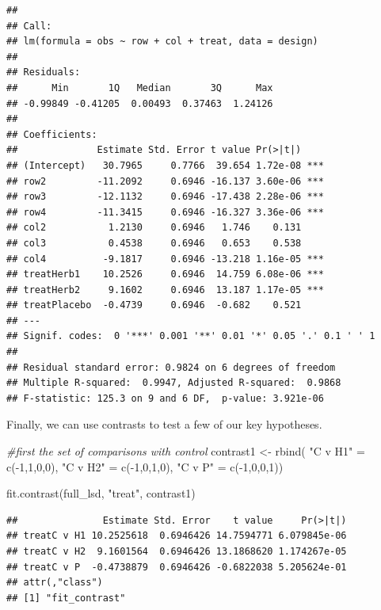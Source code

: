 \documentclass[
]{book}
\newenvironment{Shaded}{\begin{snugshade}}{\end{snugshade}}
\newcommand{\CommentTok}[1]{\textcolor[rgb]{0.56,0.35,0.01}{\textit{#1}}}
\newcommand{\DecValTok}[1]{\textcolor[rgb]{0.00,0.00,0.81}{#1}}
\newcommand{\FunctionTok}[1]{\textcolor[rgb]{0.00,0.00,0.00}{#1}}
\newcommand{\NormalTok}[1]{#1}
\newcommand{\OtherTok}[1]{\textcolor[rgb]{0.56,0.35,0.01}{#1}}
\newcommand{\SpecialCharTok}[1]{\textcolor[rgb]{0.00,0.00,0.00}{#1}}
\newcommand{\StringTok}[1]{\textcolor[rgb]{0.31,0.60,0.02}{#1}}
\begin{document}
\begin{verbatim}
## 
## Call:
## lm(formula = obs ~ row + col + treat, data = design)
## 
## Residuals:
##      Min       1Q   Median       3Q      Max 
## -0.99849 -0.41205  0.00493  0.37463  1.24126 
## 
## Coefficients:
##              Estimate Std. Error t value Pr(>|t|)    
## (Intercept)   30.7965     0.7766  39.654 1.72e-08 ***
## row2         -11.2092     0.6946 -16.137 3.60e-06 ***
## row3         -12.1132     0.6946 -17.438 2.28e-06 ***
## row4         -11.3415     0.6946 -16.327 3.36e-06 ***
## col2           1.2130     0.6946   1.746    0.131    
## col3           0.4538     0.6946   0.653    0.538    
## col4          -9.1817     0.6946 -13.218 1.16e-05 ***
## treatHerb1    10.2526     0.6946  14.759 6.08e-06 ***
## treatHerb2     9.1602     0.6946  13.187 1.17e-05 ***
## treatPlacebo  -0.4739     0.6946  -0.682    0.521    
## ---
## Signif. codes:  0 '***' 0.001 '**' 0.01 '*' 0.05 '.' 0.1 ' ' 1
## 
## Residual standard error: 0.9824 on 6 degrees of freedom
## Multiple R-squared:  0.9947, Adjusted R-squared:  0.9868 
## F-statistic: 125.3 on 9 and 6 DF,  p-value: 3.921e-06
\end{verbatim}

Finally, we can use contrasts to test a few of our key hypotheses.

\begin{Shaded}
\begin{Highlighting}[]
\CommentTok{\#first the set of comparisons with control}
\NormalTok{contrast1 }\OtherTok{\textless{}{-}} \FunctionTok{rbind}\NormalTok{(}
  \StringTok{"C v H1"} \OtherTok{=} \FunctionTok{c}\NormalTok{(}\SpecialCharTok{{-}}\DecValTok{1}\NormalTok{,}\DecValTok{1}\NormalTok{,}\DecValTok{0}\NormalTok{,}\DecValTok{0}\NormalTok{),}
  \StringTok{"C v H2"} \OtherTok{=} \FunctionTok{c}\NormalTok{(}\SpecialCharTok{{-}}\DecValTok{1}\NormalTok{,}\DecValTok{0}\NormalTok{,}\DecValTok{1}\NormalTok{,}\DecValTok{0}\NormalTok{),}
  \StringTok{"C v P"} \OtherTok{=} \FunctionTok{c}\NormalTok{(}\SpecialCharTok{{-}}\DecValTok{1}\NormalTok{,}\DecValTok{0}\NormalTok{,}\DecValTok{0}\NormalTok{,}\DecValTok{1}\NormalTok{))}

\FunctionTok{fit.contrast}\NormalTok{(full\_lsd, }\StringTok{"treat"}\NormalTok{, contrast1)}
\end{Highlighting}
\end{Shaded}

\begin{verbatim}
##               Estimate Std. Error    t value     Pr(>|t|)
## treatC v H1 10.2525618  0.6946426 14.7594771 6.079845e-06
## treatC v H2  9.1601564  0.6946426 13.1868620 1.174267e-05
## treatC v P  -0.4738879  0.6946426 -0.6822038 5.205624e-01
## attr(,"class")
## [1] "fit_contrast"
\end{verbatim}
\end{document}
